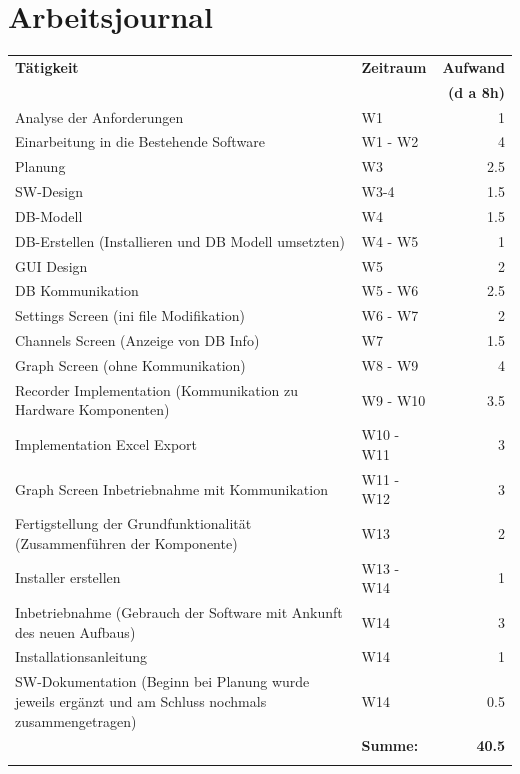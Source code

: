 \documentclass[10pt]{scrartcl}
\begin{document}
\section{Arbeitsjournal}
\begin{center}
	\begin{tabular}{p{6cm} | l | r}
		\textbf{Tätigkeit} & \textbf{Zeitraum} & \textbf{Aufwand} \\ &&\textbf{(d a 8h)}\\
		\hline Analyse der Anforderungen & W1 & 1 \\
		\hline Einarbeitung in die Bestehende Software & W1 - W2 & 4 \\
		\hline Planung & W3 & 2.5 \\
		\hline SW-Design & W3-4 & 1.5 \\
		\hline DB-Modell & W4 & 1.5 \\
		\hline DB-Erstellen (Installieren und DB Modell umsetzten) & W4 - W5 & 1 \\
		\hline GUI Design & W5 & 2 \\
		\hline DB Kommunikation & W5 - W6 & 2.5 \\
		\hline Settings Screen (ini file Modifikation) & W6 - W7 & 2 \\
		\hline Channels Screen (Anzeige von DB Info) & W7 & 1.5 \\
		\hline Graph Screen (ohne Kommunikation) & W8 - W9 & 4 \\
		\hline Recorder Implementation (Kommunikation zu Hardware Komponenten) & W9 - W10 & 3.5 \\
		\hline Implementation Excel Export & W10 - W11 & 3 \\
		\hline Graph Screen Inbetriebnahme mit Kommunikation & W11 - W12 & 3 \\
		\hline Fertigstellung der Grundfunktionalität (Zusammenführen der Komponente) & W13 & 2 \\
		\hline Installer erstellen & W13 - W14 & 1 \\
		\hline Inbetriebnahme (Gebrauch der Software mit Ankunft des neuen Aufbaus) & W14 & 3 \\
		\hline Installationsanleitung & W14 & 1 \\
		\hline SW-Dokumentation (Beginn bei Planung wurde jeweils ergänzt und am Schluss nochmals zusammengetragen) & W14 & 0.5 \\\hhline{~--}
		& \textbf{Summe:} & \textbf{40.5} \\\hhline{~~=}
	\end{tabular}
\end{center}
\end{document}
